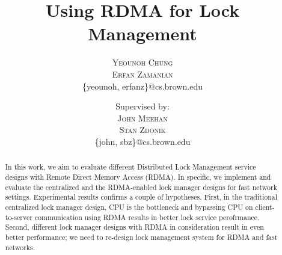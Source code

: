\documentclass[twoside]{article}
\title{\vspace{-15mm}\fontsize{24pt}{10pt}\selectfont\textbf{Using RDMA for Lock Management}}
\author{
\normalsize{} 
\large
\textsc{Yeounoh Chung} \\
\textsc{Erfan Zamanian} \\[2mm]
\normalsize{\{yeounoh, erfanz\}@cs.brown.edu} 
\and
\normalsize{Supervised by:} \\[1mm]
\textsc{John Meehan} \\
\textsc{Stan Zdonik} \\[2mm]
\normalsize{\{john, sbz\}@cs.brown.edu}
\vspace{5mm}
}
\date{}
\begin{document}
\maketitle 

\thispagestyle{fancy} 






\begin{abstract}
In this work, we aim to evaluate different Distributed Lock Management service designs with Remote Direct Memory Access (RDMA). In specific, we implement and evaluate the centralized and the RDMA-enabled lock manager designs for fast network settings. Experimental results confirms a couple of hypotheses. First, in the traditional centralized lock manager design, CPU is the bottleneck and bypassing CPU on client-to-server communication using RDMA results in better lock service perofrmance. Second, different lock manager designs with RDMA in consideration result in even better performance; we need to re-design lock management system for RDMA and fast networks.
\end{abstract}
\end{document}
